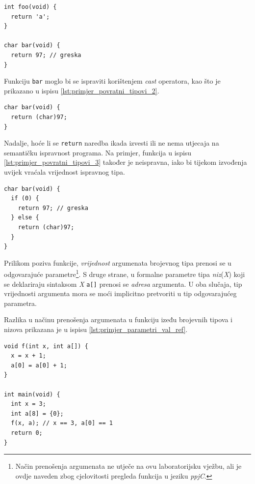 \documentclass[times, 12pt, utf8]{book}
\begin{document}
\begin{lstlisting}[caption={Ispravna funkcija \texttt{foo} i neispravna funkcija \texttt{bar}.},label=lst:primjer_povratni_tipovi_1]
int foo(void) {
  return 'a';
}

char bar(void) {
  return 97; // greska
}
\end{lstlisting}

Funkciju \verb|bar| moglo bi se ispraviti korištenjem \emph{cast} operatora, kao što je prikazano u ispisu \ref{lst:primjer_povratni_tipovi_2}.

\begin{lstlisting}[caption={Ispravljena funkcija \texttt{bar}.},label=lst:primjer_povratni_tipovi_2]
char bar(void) {
  return (char)97;
}
\end{lstlisting}

Nadalje, hoće li se \verb|return| naredba ikada izvesti ili ne nema utjecaja na semantičku ispravnost programa.
Na primjer, funkcija u ispisu \ref{lst:primjer_povratni_tipovi_3} također je neispravna, iako bi tijekom izvođenja uvijek vraćala vrijednost ispravnog tipa.

\begin{lstlisting}[caption={Ispravnost tipova povratnih vrijednosti ne ovisi o tome hoće li se određena \texttt{return} naredba ikada izvršiti ili ne.},label=lst:primjer_povratni_tipovi_3]
char bar(void) {
  if (0) {
    return 97; // greska
  } else {
    return (char)97;
  }
}
\end{lstlisting}

Prilikom poziva funkcije, \emph{vrijednost} argumenata brojevnog tipa prenosi se u odgovarajuće parametre\footnote{Način prenošenja argumenata ne utječe na ovu laboratorijsku vježbu, ali je ovdje naveden zbog cjelovitosti pregleda funkcija u jeziku \emph{ppjC}.}.
S druge strane, u formalne parametre tipa \emph{niz}(\emph{X}) koji se deklariraju sintaksom \emph{X} \verb|a[]| prenosi se \emph{adresa} argumenta.
U oba slučaja, tip vrijednosti argumenta mora se moći implicitno pretvoriti u tip odgovarajućeg parametra.

Razlika u načinu prenošenja argumenata u funkciju izeđu brojevnih tipova i nizova prikazana je u ispisu \ref{lst:primjer_parametri_val_ref}.

\begin{lstlisting}[caption={Brojevni tipovi se prenose \emph{razmjenom vrijednosti}. Nizovi se prenose \emph{razmjenom adresa}.},label=lst:primjer_parametri_val_ref]
void f(int x, int a[]) {
  x = x + 1;
  a[0] = a[0] + 1;
}

int main(void) {
  int x = 3;
  int a[8] = {0};
  f(x, a); // x == 3, a[0] == 1
  return 0;
}
\end{lstlisting}
\end{document}
